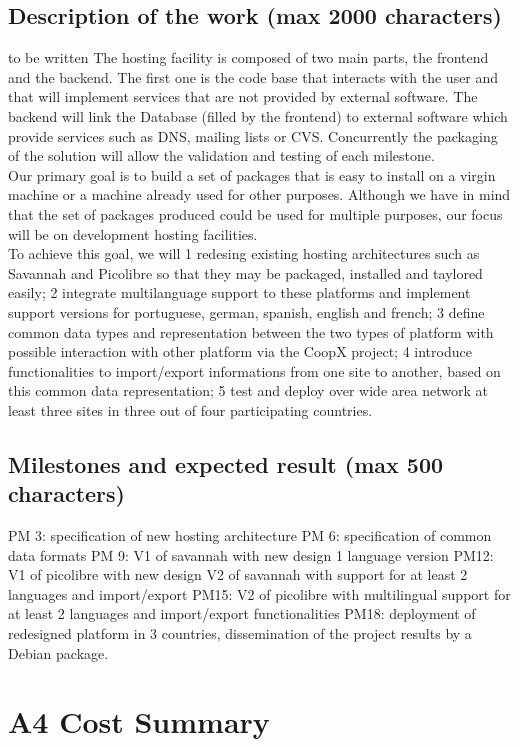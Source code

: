 \documentclass[a4paper,11pt]{report}
\begin{document}
\subsection*{Description of the work (max 2000 characters)} to be written
The hosting facility is composed of two main parts, the frontend and the
backend. The first one is the code base that interacts with the user and that
will implement services that are not provided by external software. The backend
will link the Database (filled by the frontend) to external software which
provide services such as DNS, mailing lists or CVS. Concurrently the packaging
of the solution will allow the validation and testing of each milestone.\\
Our primary goal is to build a set of packages that is easy to
install on a virgin machine or a machine already used for other
purposes. 
Although we have in mind that the set of packages produced could be used for
multiple purposes, our focus will be on development hosting facilities. \\

To achieve this goal, we will 
1 redesing existing hosting architectures such as Savannah and Picolibre 
  so that they may be packaged, installed and taylored easily; 
2 integrate multilanguage support to these platforms and implement support
  versions for portuguese, german, spanish, english and french;
3 define common data types and representation between the two types of
  platform with possible interaction with other platform via the CoopX project;
4 introduce functionalities to import/export informations from one site to
  another, based on this common data representation;
5 test and deploy over wide area network at least three sites in three out
	of four participating countries.
\subsection*{Milestones and expected result (max 500 characters)}
PM 3: specification of new hosting architecture
PM 6: specification of common data formats
PM 9: V1 of savannah with new design 1 language version
PM12: V1 of picolibre with new design
      V2 of savannah with support for at least 2 languages and import/export
PM15: V2 of picolibre with multilingual support for at least 2 languages and
      import/export functionalities
PM18: deployment of redesigned platform in 3 countries, 
      dissemination of the project results by a Debian package.
\section*{A4 Cost Summary}
\end{document}

